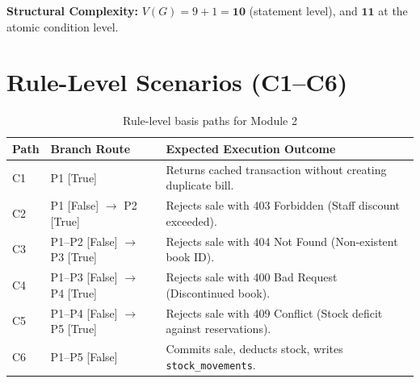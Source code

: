 \documentclass[12pt, a4paper]{report}
\begin{document}
\textbf{Structural Complexity:} $V(G) = 9 + 1 = \mathbf{10}$ (statement level), and $\mathbf{11}$ at the atomic condition level.

\section{Rule-Level Scenarios (C1--C6)}
\begin{table}[H]
\centering
\footnotesize
\begin{tabularx}{\textwidth}{L{1.2cm} L{6.0cm} L{8.0cm}}
\toprule
\textbf{Path} & \textbf{Branch Route} & \textbf{Expected Execution Outcome} \\
\midrule
C1 & P1 [True] & Returns cached transaction without creating duplicate bill. \\
C2 & P1 [False] $\to$ P2 [True] & Rejects sale with 403 Forbidden (Staff discount exceeded). \\
C3 & P1--P2 [False] $\to$ P3 [True] & Rejects sale with 404 Not Found (Non-existent book ID). \\
C4 & P1--P3 [False] $\to$ P4 [True] & Rejects sale with 400 Bad Request (Discontinued book). \\
C5 & P1--P4 [False] $\to$ P5 [True] & Rejects sale with 409 Conflict (Stock deficit against reservations). \\
C6 & P1--P5 [False] & Commits sale, deducts stock, writes \texttt{stock\_movements}. \\
\bottomrule
\end{tabularx}
\caption{Rule-level basis paths for Module 2}
\label{tab:paths_2}
\end{table}
\end{document}
